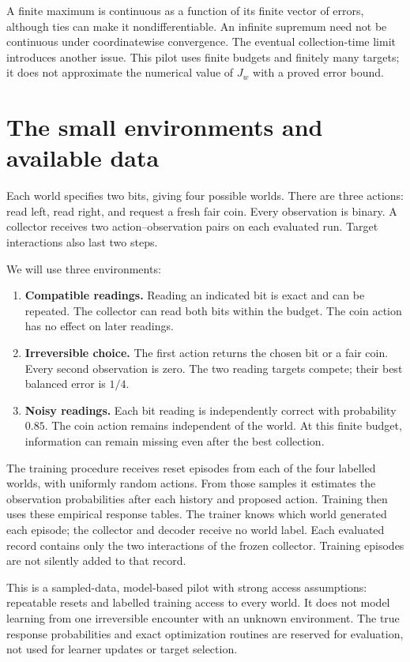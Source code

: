 \documentclass[11pt]{article}
\begin{document}
A finite maximum is continuous as a function of its finite vector of errors,
although ties can make it nondifferentiable. An infinite supremum need not be
continuous under coordinatewise convergence. The eventual collection-time limit
introduces another issue. This pilot uses finite budgets and finitely many
targets; it does not approximate the numerical value of $J_w$ with a proved error
bound.

\section{The small environments and available data}
Each world specifies two bits, giving four possible worlds. There are three
actions: read left, read right, and request a fresh fair coin. Every observation
is binary. A collector receives two action--observation pairs on each evaluated
run. Target interactions also last two steps.

We will use three environments:
\begin{enumerate}
\item \textbf{Compatible readings.} Reading an indicated bit is exact and can be
repeated. The collector can read both bits within the budget. The coin action
has no effect on later readings.
\item \textbf{Irreversible choice.} The first action returns the chosen bit or
a fair coin. Every second observation is zero. The two reading targets compete;
their best balanced error is $1/4$.
\item \textbf{Noisy readings.} Each bit reading is independently correct with
probability $0.85$. The coin action remains independent of the world. At this
finite budget, information can remain missing even after the best collection.
\end{enumerate}

The training procedure receives reset episodes from each of the four labelled
worlds, with uniformly random actions. From those samples it estimates the
observation probabilities after each history and proposed action. Training then
uses these empirical response tables. The trainer knows which world generated
each episode; the collector and decoder receive no world label. Each evaluated
record contains only the two interactions of the frozen collector. Training
episodes are not silently added to that record.

This is a sampled-data, model-based pilot with strong access assumptions:
repeatable resets and labelled training access to every world. It does not model
learning from one irreversible encounter with an unknown environment. The true
response probabilities and exact optimization routines are reserved for
evaluation, not used for learner updates or target selection.
\end{document}
